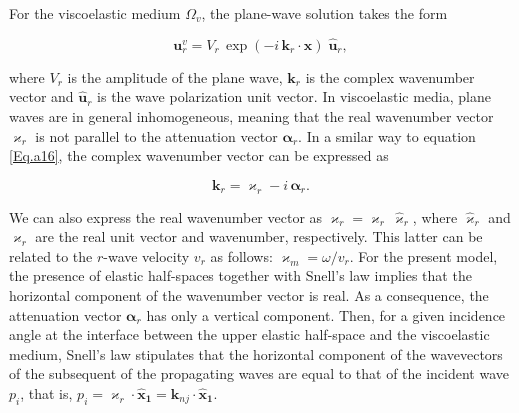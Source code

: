\documentclass[draft]{agujournal2019}
\begin{document}
For the viscoelastic medium $\Omega_v$, the plane-wave solution takes the form
\begin{linenomath*}
\begin{equation}\label{Eq.b5}
\bm{u}_r^v = V_r\, \exp (- i \,\bm{k}_r \cdot \bm {x} ) \; \bm{\hat {u}}_r, 
\end{equation}
\end{linenomath*}
where $V_r$ is the amplitude of the plane wave, $\bm{k}_r$ is the complex wavenumber vector and $\bm{\hat {u}}_r$ is the wave polarization unit vector. In viscoelastic media, plane waves are in general inhomogeneous,
meaning that the real wavenumber vector $\bm{\varkappa}_r $  is not parallel to the attenuation vector $\bm{\alpha}_r$.  In a smilar way to equation \eqref{Eq.a16}, the complex wavenumber vector can be expressed as
\begin{linenomath*}
\begin{equation}\label{Eq.b6}
\bm{k}_r= \bm{\varkappa}_r - i\, \bm{\alpha}_r.
\end{equation}
\end{linenomath*}
We can also express the real wavenumber vector as $\bm{\varkappa}_r = {\varkappa}_r \, \bm{\hat{\varkappa}}_r $, where $\bm{\hat{\varkappa}}_r$ and ${\varkappa}_r$ are the real unit vector and  wavenumber, respectively. This latter can be related to the $r$-wave velocity $v_r$ as follows: ${\varkappa}_m = \omega/v_r$. For the present model, the presence of elastic half-spaces together with Snell's law implies that the horizontal component of the wavenumber vector is real. As a consequence, the attenuation vector $\bm{\alpha}_r$ has only a vertical component. Then, for a given incidence angle at the interface between the upper elastic half-space and the viscoelastic medium, Snell's law stipulates that the horizontal component of the wavevectors of the subsequent of the propagating waves are equal to that of the incident wave $p_i$, that is, $p_i = \bm{\varkappa}_{r} \cdot \bm{\hat{x}_1} = \bm{k}_{nj} \cdot \bm{\hat{x}_1}$.
\end{document}
